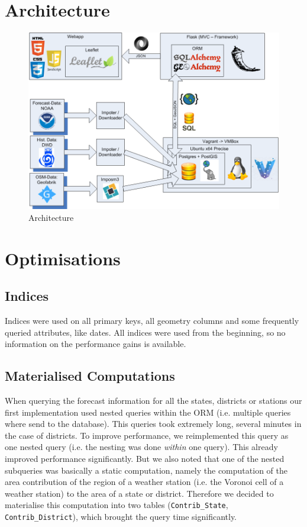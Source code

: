 \documentclass[paper=a4, fontsize=11pt]{scrartcl} %
\numberwithin{equation}{section} %
\numberwithin{figure}{section} %
\numberwithin{table}{section} %
\begin{document}
\section{Architecture}
\begin{figure}[htbp]
\includegraphics[width=1\textwidth]{pictures/Architektur.png}
\caption{Architecture}
\end{figure}

\section{Optimisations}

\subsection{Indices}

Indices were used on all primary keys, all geometry columns and some frequently queried attributes, like dates. All indices were used from the beginning, so no information on the performance gains is available.

\subsection{Materialised Computations}

When querying the forecast information for all the states, districts or stations our first implementation used nested queries within the ORM (i.e. multiple queries where send to the database). This queries took extremely long, several minutes in the case of districts. To improve performance, we reimplemented this query as one nested query (i.e. the nesting was done \emph{within} one query). This already improved performance significantly. But we also noted that one of the nested subqueries was basically a static computation, namely the computation of the area contribution of the region of a weather station (i.e. the Voronoi cell of a weather station) to the area of a state or district. Therefore we decided to materialise this computation into two tables (\lstinline{Contrib_State}, \lstinline{Contrib_District}), which brought the query time significantly. 
\end{document}
